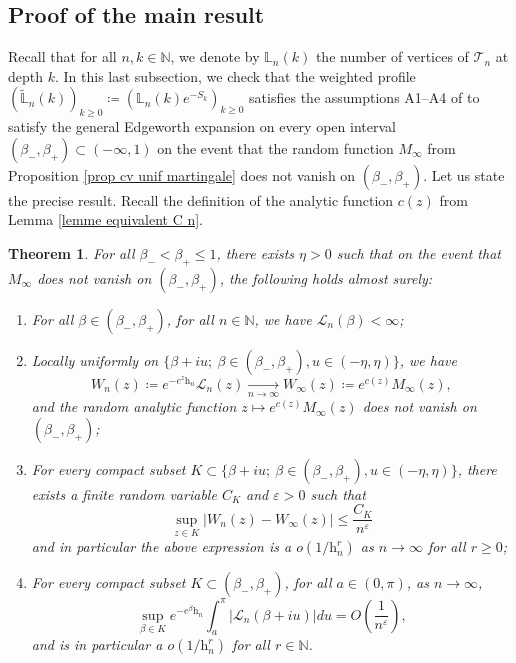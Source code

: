 \documentclass[11pt]{article}
\newtheorem{theorem}{Theorem}[section]
\numberwithin{equation}{section}
\def\vp{\varepsilon}
\def \N{\mathbb{N}}
\def \T{\mathcal{T}}
\def \cL{\mathcal{L}}
\begin{document}
\subsection{Proof of the main result}\label{sous-section preuve du profil}
Recall that for all $n, k \in \N$, we denote by $\mathbb{L}_n(k)$ the number of vertices of $\T_n$ at depth $k$. In this last subsection, we check that the weighted profile $(\widetilde{\mathbb{L}}_n(k))_{k\ge 0} \coloneqq (\mathbb{L}_n(k) e^{-S_k})_{k\ge 0}$ satisfies the assumptions A1--A4 of \cite{KMS17} to satisfy the general Edgeworth expansion on every open interval $(\beta_-, \beta_+) \subset (-\infty, 1)$ on the event that the random function $M_\infty$ from Proposition \ref{prop cv unif martingale} does not vanish on $(\beta_-, \beta_+)$. Let us state the precise result. Recall the definition of the analytic function $c(z)$ from Lemma \ref{lemme equivalent C n}.
\begin{theorem}\label{th edgeworth expansion}
	For all $\beta_-<\beta_+\le 1$, there exists $\eta>0$ such that on the event that $M_\infty$ does not vanish on $(\beta_-, \beta_+)$, the following holds almost surely:
	\begin{enumerate}[({A}1)]
		\item For all $\beta \in (\beta_-, \beta_+)$, for all $n\in \N$, we have $\cL_n(\beta)<\infty$;
		\item Locally uniformly on $ \{\beta + iu; \ \beta \in (\beta_-, \beta_+), u \in (-\eta, \eta)\}$, we have
		\[
		W_n(z) \coloneqq e^{-e^z \mathrm{h}_n} \cL_n(z) \mathop{\longrightarrow}\limits_{n\to \infty} W_\infty(z) \coloneqq e^{c(z)} M_\infty(z),
		\]
		and the random analytic function $z \mapsto e^{c(z)} M_\infty(z)$ does not vanish on $(\beta_-, \beta_+)$;
		\item For every compact subset $K \subset \{\beta + iu; \ \beta \in (\beta_-, \beta_+), u \in (-\eta, \eta)\}$, there exists a finite random variable $C_K$ and $\vp>0$ such that 
		\[
		\sup_{z \in K} \left\vert W_n(z)- W_\infty(z)  \right\vert \le \frac{C_K}{n^\vp}
		\]
		and in particular the above expression is a $o({1}/{\mathrm{h}_n^r})$ as $n\to \infty$ for all $r \ge 0$;
		\item For every compact subset $K \subset (\beta_-, \beta_+)$, for all $a \in (0, \pi)$, as $n\to \infty$,
		\[
		\sup_{\beta \in K} e^{-e^\beta \mathrm{h}_n} \int_a^\pi \vert \cL_n(\beta +iu) \vert du = O \left(\frac{1}{n^\vp}\right),
		\]
		and is in particular a $o(1/\mathrm{h}_n^r)$ for all $r \in \N$.
	\end{enumerate}
\end{theorem}
\end{document}
